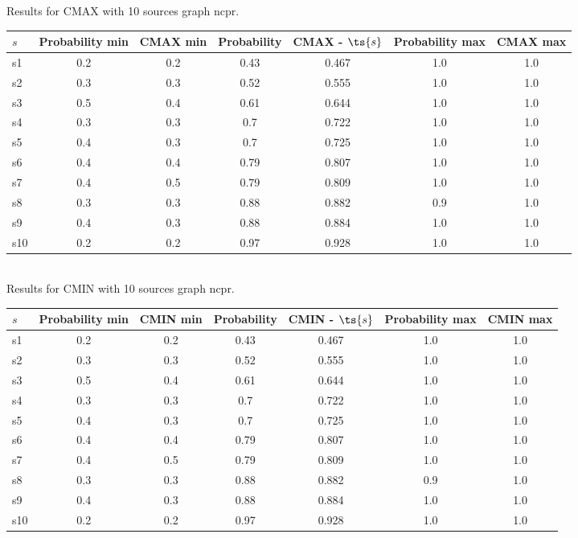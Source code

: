 \documentclass{article}
\begin{document}
\noindent Results for CMAX with 10 sources graph ncpr.

\noindent\begin{tabular}{|l|c|c|c|c|c|c|}
\hline
$s$& Probability min & CMAX min & Probability & CMAX - $\ts{s}$ & Probability max & CMAX max\\
\hline
s1 &0.2 & 0.2 & 0.43 & 0.467 & 1.0 & 1.0\\
\hline
s2 &0.3 & 0.3 & 0.52 & 0.555 & 1.0 & 1.0\\
\hline
s3 &0.5 & 0.4 & 0.61 & 0.644 & 1.0 & 1.0\\
\hline
s4 &0.3 & 0.3 & 0.7 & 0.722 & 1.0 & 1.0\\
\hline
s5 &0.4 & 0.3 & 0.7 & 0.725 & 1.0 & 1.0\\
\hline
s6 &0.4 & 0.4 & 0.79 & 0.807 & 1.0 & 1.0\\
\hline
s7 &0.4 & 0.5 & 0.79 & 0.809 & 1.0 & 1.0\\
\hline
s8 &0.3 & 0.3 & 0.88 & 0.882 & 0.9 & 1.0\\
\hline
s9 &0.4 & 0.3 & 0.88 & 0.884 & 1.0 & 1.0\\
\hline
s10 &0.2 & 0.2 & 0.97 & 0.928 & 1.0 & 1.0\\
\hline
\end{tabular}\\

\noindent Results for CMIN with 10 sources graph ncpr.

\noindent\begin{tabular}{|l|c|c|c|c|c|c|}
\hline
$s$& Probability min & CMIN min & Probability & CMIN - $\ts{s}$ & Probability max & CMIN max\\
\hline
s1 &0.2 & 0.2 & 0.43 & 0.467 & 1.0 & 1.0\\
\hline
s2 &0.3 & 0.3 & 0.52 & 0.555 & 1.0 & 1.0\\
\hline
s3 &0.5 & 0.4 & 0.61 & 0.644 & 1.0 & 1.0\\
\hline
s4 &0.3 & 0.3 & 0.7 & 0.722 & 1.0 & 1.0\\
\hline
s5 &0.4 & 0.3 & 0.7 & 0.725 & 1.0 & 1.0\\
\hline
s6 &0.4 & 0.4 & 0.79 & 0.807 & 1.0 & 1.0\\
\hline
s7 &0.4 & 0.5 & 0.79 & 0.809 & 1.0 & 1.0\\
\hline
s8 &0.3 & 0.3 & 0.88 & 0.882 & 0.9 & 1.0\\
\hline
s9 &0.4 & 0.3 & 0.88 & 0.884 & 1.0 & 1.0\\
\hline
s10 &0.2 & 0.2 & 0.97 & 0.928 & 1.0 & 1.0\\
\hline
\end{tabular}\\
\end{document}
